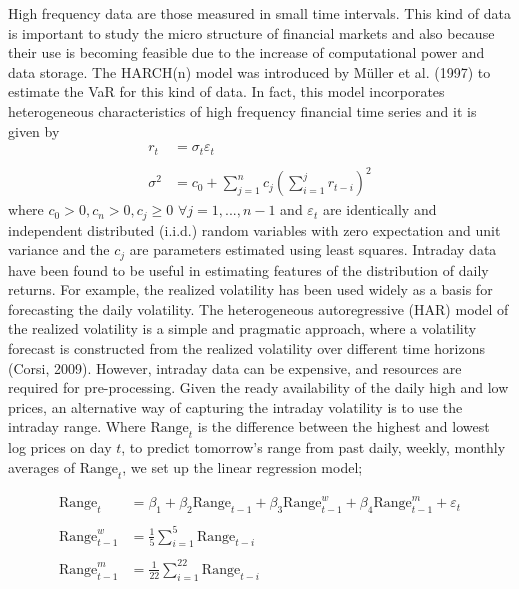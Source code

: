 \documentclass[a4paper,11pt,oneside]{book}
\begin{document}
High frequency data are those measured in small time intervals. This kind of data is important
to study the micro structure of financial markets and also because their use is becoming feasible
due to the increase of computational power and data storage. The HARCH(n) model was
introduced by Müller et al. (1997) to estimate the VaR for this kind of data. In fact, this model incorporates
heterogeneous characteristics of high frequency financial time series and it is given by 
\begin{equation}
\begin{aligned}
r_t &= \sigma_t\varepsilon_t
\\
\\
\sigma^2 &= c_0 + \sum_{j=1}^{n}c_j\left(\sum_{i=1}^{j}r_{t-i}\right)^2
\label{3}
\end{aligned}
\end{equation}
where $c_0>0, c_n > 0, c_j \ge 0$ $\forall j = 1,...,n-1$ and $\varepsilon_t$ are identically and independent distributed (i.i.d.) random variables with zero expectation and unit variance and the $c_j$ are parameters estimated using least squares.
\newline
\newline
Intraday data have been found to be useful in estimating features of the distribution of daily returns. For
example, the realized volatility has been used widely
as a basis for forecasting the daily volatility. The heterogeneous autoregressive (HAR) model of the realized
volatility is a simple and pragmatic approach, where a
volatility forecast is constructed from the realized volatility over different time horizons (Corsi, 2009). However,
intraday data can be expensive, and resources are required for pre-processing. Given the ready availability
of the daily high and low prices, an alternative way of
capturing the intraday volatility is to use the intraday range. Where $\text{Range}_{t}$
is the difference between the highest and
lowest log prices on day $t$, to predict tomorrow's range from past daily, weekly, monthly averages of $\text{Range}_{t}$, we set up the linear regression model;

\begin{equation}
\begin{aligned}
\text{Range}_{t}&=\beta_1+\beta_{2}\text{Range}_{t-1} + \beta_{3}\text{Range}^{w}_{t-1} + \beta_{4}\text{Range}^{m}_{t-1} + \varepsilon_t
\\
\\
\text{Range}^{w}_{t-1}&=\frac{1}{5}\sum_{i=1}^{5}\text{Range}_{t-i}
\\
\\
\text{Range}^{m}_{t-1}&=\frac{1}{22}\sum_{i=1}^{22}\text{Range}_{t-i}
\label{4}
\end{aligned}
\end{equation}
\end{document}
